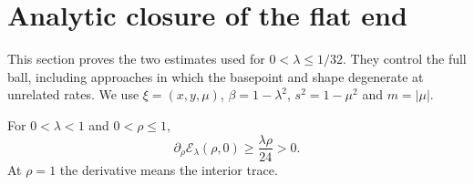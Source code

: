 \section{Analytic closure of the flat end}\label{sec:oblate_analytic}

This section proves the two estimates used for $0<\lambda\le1/32$. They control the full ball, including approaches in which the basepoint and shape degenerate at unrelated rates. We use $\xi=(x,y,\mu)$, $\beta=1-\lambda^2$, $s^2=1-\mu^2$ and $m=|\mu|$.

\begin{lemma}\label{lem:equatorial}
For $0<\lambda<1$ and $0<\rho\le1$,
\begin{equation}\label{eq:equatorial_bound}
 \partial_\rho\mathcal E_\lambda(\rho,0)\ge\frac{\lambda\rho}{24}>0.
\end{equation}
At $\rho=1$ the derivative means the interior trace.
\end{lemma}
